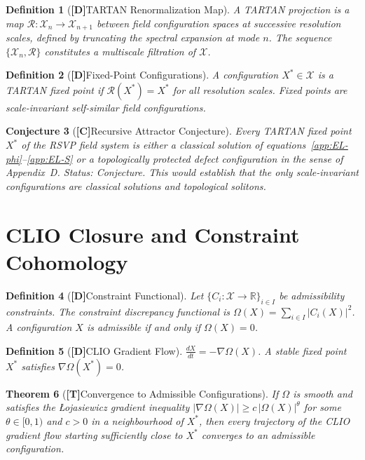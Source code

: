 \documentclass[12pt,a4paper]{article}
\newcommand{\claimD}{\textbf{[D]}\;}
\newcommand{\claimT}{\textbf{[T]}\;}
\newcommand{\claimC}{\textbf{[C]}\;}
\newtheorem{defn}{Definition}[section]
\newtheorem{appconj}[defn]{Conjecture}
\newtheorem{appthm}[defn]{Theorem}
\begin{document}
\begin{defn}[\claimD TARTAN Renormalization Map]
A \emph{TARTAN projection} is a map
$\mathcal{R}: \mathcal{X}_n \to \mathcal{X}_{n+1}$
between field configuration spaces at successive resolution scales, defined by
truncating the spectral expansion at mode $n$. The sequence
$\{\mathcal{X}_n, \mathcal{R}\}$ constitutes a multiscale filtration of
$\mathcal{X}$.
\end{defn}

\begin{defn}[\claimD Fixed-Point Configurations]
A configuration $X^\ast \in \mathcal{X}$ is a \emph{TARTAN fixed point} if
$\mathcal{R}(X^\ast) = X^\ast$ for all resolution scales. Fixed points are
scale-invariant self-similar field configurations.
\end{defn}

\begin{appconj}[\claimC Recursive Attractor Conjecture]
Every TARTAN fixed point $X^\ast$ of the RSVP field system is either a
classical solution of equations~\eqref{app:EL-phi}--\eqref{app:EL-S}
or a topologically protected defect configuration in the sense of Appendix~D.
\emph{Status: Conjecture.} This would establish that the only scale-invariant
configurations are classical solutions and topological solitons.
\end{appconj}

\section{CLIO Closure and Constraint Cohomology}

\begin{defn}[\claimD Constraint Functional]
Let $\{C_i: \mathcal{X}\to\mathbb{R}\}_{i\in I}$ be admissibility constraints.
The constraint discrepancy functional is
$\Omega(X) = \sum_{i\in I} |C_i(X)|^2$.
A configuration $X$ is admissible if and only if $\Omega(X) = 0$.
\end{defn}

\begin{defn}[\claimD CLIO Gradient Flow]
$\frac{dX}{dt} = -\nabla\Omega(X)$.
A stable fixed point $X^\ast$ satisfies $\nabla\Omega(X^\ast) = 0$.
\end{defn}

\begin{appthm}[\claimT Convergence to Admissible Configurations]
If $\Omega$ is smooth and satisfies the Łojasiewicz gradient inequality
$|\nabla\Omega(X)| \geq c\,|\Omega(X)|^\theta$ for some $\theta\in[0,1)$
and $c>0$ in a neighbourhood of $X^\ast$, then every trajectory of the
CLIO gradient flow starting sufficiently close to $X^\ast$ converges to
an admissible configuration.
\end{appthm}
\end{document}
